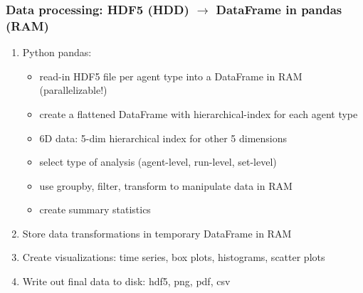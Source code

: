 \documentclass[9pt,sansserif]{beamer}
\newlength{\parskipbackup}
\newlength{\parindentbackup}
\let\notebackup\note
\renewcommand{\note}[1]{\notebackup{%
	\mode<handout>{\addtocounter{page}{-1}}%
	\setlength{\parindent}{0ex}%
	\setlength{\parskip}{10pt}%
	\noindent%
	{\normalsize{}#1}%
	\setlength{\parskip}{\parskipbackup}%
	\setlength{\parindent}{\parindentbackup}%
}%
}
\begin{document}
\begin{frame}{}\small
\frametitle{Data processing: HDF5 (HDD) $\rightarrow$ DataFrame in pandas (RAM)}

\bigskip
\begin{enumerate}\itemsep2em

\item Python pandas: 
	\begin{itemize}\itemsep1em
	\item read-in HDF5 file per agent type into a DataFrame in RAM (parallelizable!)
	\item create a flattened DataFrame with hierarchical-index for each agent type
	\item 6D data: 5-dim hierarchical index for other 5 dimensions
	\item select type of analysis (agent-level, run-level, set-level)
	\item use groupby, filter, transform to manipulate data in RAM
	\item create summary statistics
	\end{itemize}

\item Store data transformations in temporary DataFrame in RAM

\item Create visualizations: time series, box plots, histograms, scatter plots

\item Write out final data to disk: hdf5, png, pdf, csv
 
\end{enumerate}
\end{frame}
\note{
}

\end{document}
